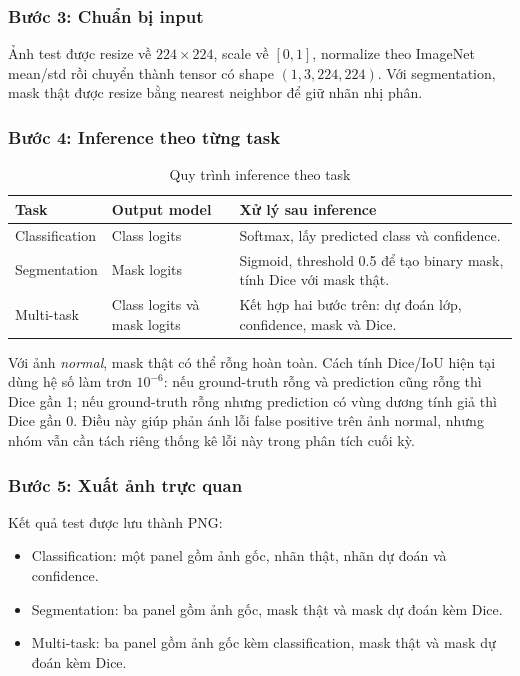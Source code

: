 \documentclass[12pt,a4paper]{article}
\begin{document}
\subsubsection*{Bước 3: Chuẩn bị input}

Ảnh test được resize về \(224 \times 224\), scale về \([0,1]\), normalize theo ImageNet mean/std rồi chuyển thành tensor có shape \((1, 3, 224, 224)\). Với segmentation, mask thật được resize bằng nearest neighbor để giữ nhãn nhị phân.

\subsubsection*{Bước 4: Inference theo từng task}

\begin{table}[H]
\centering
\caption{Quy trình inference theo task}
\renewcommand{\arraystretch}{1.25}
\begin{tabular}{p{3.2cm} p{5.2cm} p{6.2cm}}
\toprule
\textbf{Task} & \textbf{Output model} & \textbf{Xử lý sau inference} \\
\midrule
Classification & Class logits & Softmax, lấy predicted class và confidence. \\
Segmentation & Mask logits & Sigmoid, threshold 0.5 để tạo binary mask, tính Dice với mask thật. \\
Multi-task & Class logits và mask logits & Kết hợp hai bước trên: dự đoán lớp, confidence, mask và Dice. \\
\bottomrule
\end{tabular}
\end{table}

Với ảnh \textit{normal}, mask thật có thể rỗng hoàn toàn. Cách tính Dice/IoU hiện tại dùng hệ số làm trơn \(10^{-6}\): nếu ground-truth rỗng và prediction cũng rỗng thì Dice gần 1; nếu ground-truth rỗng nhưng prediction có vùng dương tính giả thì Dice gần 0. Điều này giúp phản ánh lỗi false positive trên ảnh normal, nhưng nhóm vẫn cần tách riêng thống kê lỗi này trong phân tích cuối kỳ.

\subsubsection*{Bước 5: Xuất ảnh trực quan}

Kết quả test được lưu thành PNG:

\begin{itemize}
    \item Classification: một panel gồm ảnh gốc, nhãn thật, nhãn dự đoán và confidence.
    \item Segmentation: ba panel gồm ảnh gốc, mask thật và mask dự đoán kèm Dice.
    \item Multi-task: ba panel gồm ảnh gốc kèm classification, mask thật và mask dự đoán kèm Dice.
\end{itemize}
\end{document}

